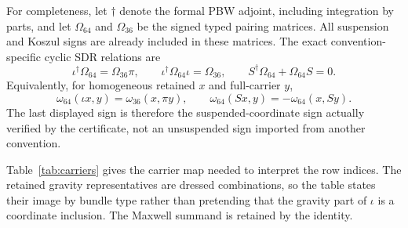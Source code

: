 \documentclass[11pt]{article}
\theoremstyle{definition}
\theoremstyle{remark}
\begin{document}
For completeness, let $\dagger$ denote the formal PBW adjoint, including
integration by parts, and let $\Omega_{64}$ and $\Omega_{36}$ be the signed
typed pairing matrices.  All suspension and Koszul signs are already included
in these matrices.  The exact convention-specific cyclic SDR relations are
\begin{equation}\label{eq:cyclic-sdr}
 \iota^\dagger\Omega_{64}=\Omega_{36}\pi,\qquad
 \iota^\dagger\Omega_{64}\iota=\Omega_{36},\qquad
 S^\dagger\Omega_{64}+\Omega_{64}S=0.
\end{equation}
Equivalently, for homogeneous retained $x$ and full-carrier $y$,
\begin{equation}\label{eq:cyclic-sdr-bilinear}
 \omega_{64}(\iota x,y)=\omega_{36}(x,\pi y),\qquad
 \omega_{64}(Sx,y)=-\omega_{64}(x,Sy).
\end{equation}
The last displayed sign is therefore the suspended-coordinate sign actually
verified by the certificate, not an unsuspended sign imported from another
convention.

Table~\ref{tab:carriers} gives the carrier map needed to interpret the row
indices.  The retained gravity representatives are dressed combinations, so
the table states their image by bundle type rather than pretending that the
gravity part of $\iota$ is a coordinate inclusion.  The Maxwell summand is
retained by the identity.
\end{document}
